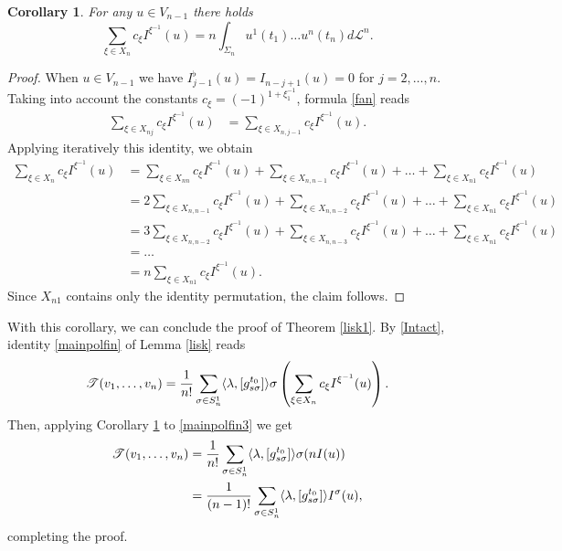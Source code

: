 \documentclass[12pt, reqno]{amsart}
\theoremstyle{plain}
\newtheorem {corollary} [theorem]{Corollary}
\theoremstyle{definition}
\theoremstyle{remark}
\numberwithin{equation}{section}
\renewcommand{\L}{\mathcal{L}}
\newcommand{\T}{\mathcal{T}}
\newcommand{\s}{\sigma}
\newcommand{\0}{\theta}
\newcommand{\1}{{-1}}
\renewcommand{\=}{\coloneqq}
\renewcommand{\.}{\dots}
\begin{document}
\begin{corollary}
	\label{corfin7}
For any  $u\in V_{n-1}$ there holds
 \[
  \sum_{\xi\in X_n } c_\xi I^{\xi^\1}(u) = %
  n     \int_{\Sigma_{n}   } u^1(t_1) \dots u^n(t_n)     d\L^n.
   \]

\end{corollary}



\begin{proof} When  $u\in V_{n-1}$ we have
$
    I^\flat_{j-1}(u)=I_{n-j+1}(u)=0$ for $j=2,\dots,n$. Taking into account the constants  $c_\xi=(-1)^{1+\xi^\1_1}$, formula \eqref{fan} reads
    \begin{align*}
    \sum_{\xi\in X_{nj}}c_\xi  I^{ \xi^\1}(u)&=      \sum_{\xi\in X_{n,j-1}} c_\xi I^{ \xi^\1}(u).
    \end{align*}
    Applying iteratively this identity, we obtain
    \begin{align*}
     \sum_{\xi\in X_{n}}c_\xi  I^{ \xi^\1}(u)&= \sum_{\xi\in X_{nn}} c_\xi I^{ \xi^\1}(u)
     +\sum_{\xi\in X_{n,n-1}} c_\xi I^{ \xi^\1}(u)+\.+\sum_{\xi\in X_{n1}} c_\xi I^{ \xi^\1}(u)
     \\
     &=2\sum_{\xi\in X_{n,n-1}} c_\xi I^{ \xi^\1}(u)
     +\sum_{\xi\in X_{n,n-2}} c_\xi I^{ \xi^\1}(u)+\.+\sum_{\xi\in X_{n1}} c_\xi I^{ \xi^\1}(u)
     \\
     &=3\sum_{\xi\in X_{n,n-2}} c_\xi I^{ \xi^\1}(u)
     +\sum_{\xi\in X_{n,n-3}} c_\xi I^{ \xi^\1}(u)+\.+\sum_{\xi\in X_{n1}} c_\xi I^{ \xi^\1}(u)
     \\
     &=\.
     \\
     &=n\sum_{\xi\in X_{n1}} c_\xi I^{ \xi^\1}(u).
    \end{align*}
    Since $X_{n1}$ contains only the identity permutation, the claim follows.
\end{proof}

{\color{black}
  With this corollary, we can conclude the proof of Theorem \ref{lisk1}. By \eqref{Intact}, identity \eqref{mainpolfin} of Lemma \ref{lisk} reads
  \begin{equation}
  	\label{mainpolfin3}
  	\T (v_1,\.,v_n)=\frac{1}{n!}\sum_{\s\in S_n^1 }
  	\langle \lambda, [g^{t_0}_{\j\s } ]\rangle \s\left(\sum_{\xi\in X_n} c_\xi I^{ \xi^\1}(u)\right).
  \end{equation} 
  Then, applying Corollary \ref{corfin7} to \eqref{mainpolfin3} we get
  \begin{equation}
  	\begin{split}
  			\T (v_1,\.,v_n)&=\frac{1}{n!}\sum_{\s\in S_n^1 }
  		\langle \lambda, [g^{t_0}_{\j\s } ]\rangle \s(nI(u))\\
  		&=\frac{1}{(n-1)!}\sum_{\s\in S_n^1 }
  		\langle \lambda, [g^{t_0}_{\j\s } ]\rangle I^\s(u),
  	\end{split}
  \end{equation}
 completing the proof.
}
 
\end{document}
